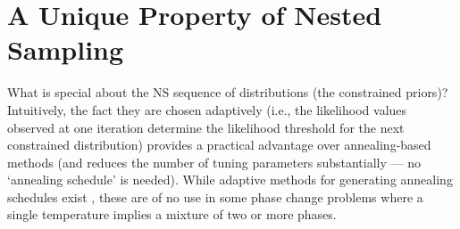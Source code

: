 \documentclass[entropy,article,submit,moreauthors,pdftex,10pt,a4paper]{Definitions/mdpi}
\begin{document}

\appendix
\section{A Unique Property of Nested Sampling}\label{sec:property}
What is special about the NS sequence of distributions (the constrained priors)?
Intuitively, the fact they are chosen adaptively (i.e., the likelihood values
observed
at one iteration determine the likelihood threshold for the next constrained
distribution)
provides a practical advantage
over annealing-based methods (and reduces the number of tuning parameters
substantially --- no `annealing schedule' is needed). While adaptive methods
for generating annealing schedules exist \citep{salomone2018unbiased}, these
are of no use in some phase change problems where a single temperature implies
a mixture of two or more phases.
\end{document}
